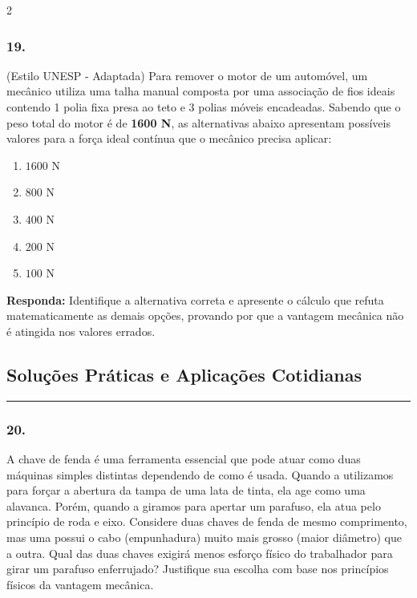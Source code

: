 \documentclass[twoside, 10pt, a4paper]{article}
\newlength{\espacoPosTitulo}
\newlength{\espacoQuestao}
\newlength{\espacoAlt}
\begin{document}
\begin{multicols*}{2}
\subsubsection*{19.} (Estilo UNESP - Adaptada) Para remover o motor de um automóvel, um mecânico utiliza uma talha manual composta por uma associação de fios ideais contendo 1 polia fixa presa ao teto e 3 polias móveis encadeadas. Sabendo que o peso total do motor é de \textbf{1600 N}, as alternativas abaixo apresentam possíveis valores para a força ideal contínua que o mecânico precisa aplicar:
\begin{enumerate}[label=\alph*), itemsep=\espacoAlt]
    \item $ 1600 \text{ N} $
    \item $ 800 \text{ N} $
    \item $ 400 \text{ N} $
    \item $ 200 \text{ N} $
    \item $ 100 \text{ N} $
\end{enumerate}
\begin{boxresponda}
\textbf{Responda:} Identifique a alternativa correta e apresente o cálculo que refuta matematicamente as demais opções, provando por que a vantagem mecânica não é atingida nos valores errados.
\end{boxresponda}
\par\vspace{\espacoQuestao}

\subsection*{Soluções Práticas e Aplicações Cotidianas}
\vspace{-0.2cm}\noindent\rule{\linewidth}{1.5pt} 
\par\vspace{\espacoPosTitulo}
\subsubsection*{20.} A chave de fenda é uma ferramenta essencial que pode atuar como duas máquinas simples distintas dependendo de como é usada. Quando a utilizamos para forçar a abertura da tampa de uma lata de tinta, ela age como uma alavanca. Porém, quando a giramos para apertar um parafuso, ela atua pelo princípio de roda e eixo. Considere duas chaves de fenda de mesmo comprimento, mas uma possui o cabo (empunhadura) muito mais grosso (maior diâmetro) que a outra. Qual das duas chaves exigirá menos esforço físico do trabalhador para girar um parafuso enferrujado? Justifique sua escolha com base nos princípios físicos da vantagem mecânica.
\par\vspace{\espacoQuestao}


\end{multicols*}
\end{document}
